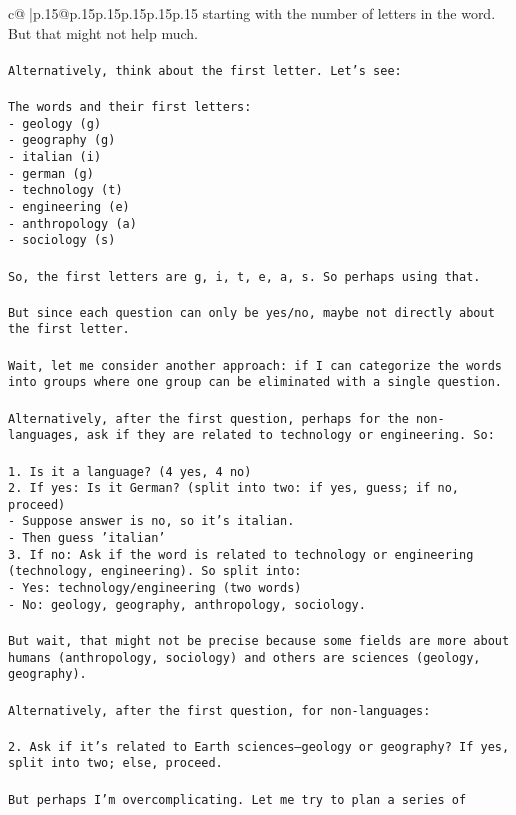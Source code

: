 \documentclass{article}
\begin{document}
{\begin{supertabular}{c@{$\;$}|p{.15\linewidth}@{}p{.15\linewidth}p{.15\linewidth}p{.15\linewidth}p{.15\linewidth}p{.15\linewidth}}
{{{starting with the number of letters in the word. But that might not help much.\\ \tt \\ \tt Alternatively, think about the first letter. Let's see:\\ \tt \\ \tt The words and their first letters:\\ \tt - geology (g)\\ \tt - geography (g)\\ \tt - italian (i)\\ \tt - german (g)\\ \tt - technology (t)\\ \tt - engineering (e)\\ \tt - anthropology (a)\\ \tt - sociology (s)\\ \tt \\ \tt So, the first letters are g, i, t, e, a, s. So perhaps using that.\\ \tt \\ \tt But since each question can only be yes/no, maybe not directly about the first letter.\\ \tt \\ \tt Wait, let me consider another approach: if I can categorize the words into groups where one group can be eliminated with a single question.\\ \tt \\ \tt Alternatively, after the first question, perhaps for the non-languages, ask if they are related to technology or engineering. So:\\ \tt \\ \tt 1. Is it a language? (4 yes, 4 no)\\ \tt 2. If yes: Is it German? (split into two: if yes, guess; if no, proceed)\\ \tt    - Suppose answer is no, so it's italian.\\ \tt    - Then guess 'italian'\\ \tt 3. If no: Ask if the word is related to technology or engineering (technology, engineering). So split into:\\ \tt    - Yes: technology/engineering (two words)\\ \tt    - No: geology, geography, anthropology, sociology.\\ \tt \\ \tt But wait, that might not be precise because some fields are more about humans (anthropology, sociology) and others are sciences (geology, geography).\\ \tt \\ \tt Alternatively, after the first question, for non-languages:\\ \tt \\ \tt 2. Ask if it's related to Earth sciences—geology or geography? If yes, split into two; else, proceed.\\ \tt \\ \tt But perhaps I'm overcomplicating. Let me try to plan a series of }}}
\end{supertabular}}
\end{document}

